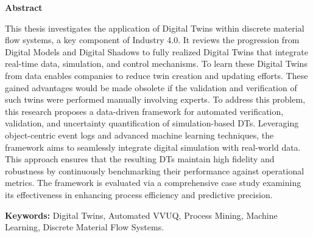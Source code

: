 \thispagestyle{plain} %

\vspace*{1.5in} %

\begin{center}
  {\Large \textbf{Abstract}}
\end{center}

This thesis investigates the application of Digital Twins within discrete material flow systems, a key component of Industry 4.0. It reviews the progression from Digital Models and Digital Shadows to fully realized Digital Twins that integrate real-time data, simulation, and control mechanisms. To learn these Digital Twins from data enables companies to reduce twin creation and updating efforts. These gained advantages would be made obsolete if the validation and verification of such twins were performed manually involving experts. To address this problem, this research proposes a data-driven framework for automated verification, validation, and uncertainty quantification of simulation-based DTs. Leveraging object-centric event logs and advanced machine learning techniques, the framework aims to seamlessly integrate digital simulation with real-world data. This approach ensures that the resulting DTs maintain high fidelity and robustness by continuously benchmarking their performance against operational metrics. The framework is evaluated via a comprehensive case study examining its effectiveness in enhancing process efficiency and predictive precision.

\medskip

\textbf{Keywords:} Digital Twins, Automated VVUQ, Process Mining, Machine Learning, Discrete Material Flow Systems.

\clearpage